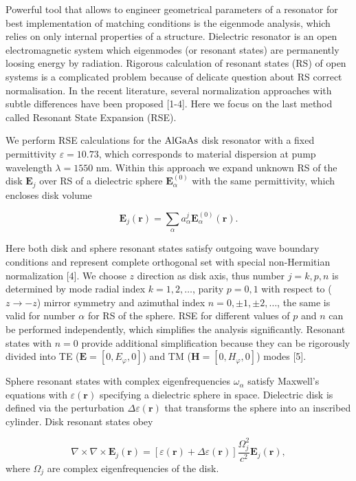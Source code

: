 \documentclass[prl,notitlepage,twocolumn]{revtex4}
\begin{document}
Powerful tool that allows to engineer geometrical parameters of a resonator for best 	implementation of matching conditions is the eigenmode analysis, which relies on only internal properties of a structure. Dielectric resonator is an open electromagnetic system which eigenmodes (or resonant states)  are permanently loosing energy by radiation. Rigorous calculation of resonant states (RS) of open systems is a complicated problem because of delicate question about RS correct normalisation. In the recent literature, several normalization approaches with subtle differences have been proposed [1-4]. Here we focus on the last method called Resonant State Expansion (RSE).

We perform RSE calculations for the ${\rm AlGaAs}$ disk resonator with a fixed permittivity $\varepsilon = 10.73$, which corresponds to material dispersion at pump wavelength $\lambda =1550$ nm. Within this approach we expand unknown RS of the disk $\mathbf{E}_{j}$ over RS of a dielectric sphere $\mathbf{E}^{(0)}_{\alpha}$ with the same permittivity, which encloses disk volume

\begin{equation}
\mathbf{E}_{j}(\mathbf{r}) = \sum_{\alpha} a_{\alpha}^j \mathbf{E}^{(0)}_{\alpha}(\mathbf{r}).
\label{eq:RS1}
\end{equation}

Here both disk and sphere resonant states satisfy outgoing wave boundary conditions and represent complete orthogonal set with special non-Hermitian normalization [4]. We choose $z$ direction as disk axis, thus number $j=k,p,n$ is determined by mode radial index $k=1,2,\dots$, parity  $p=0,1$ with respect to ($z\rightarrow -z$) mirror symmetry and azimuthal index $n=0,\pm1,\pm2,\dots$, the same is valid for number $\alpha$ for RS of the sphere. RSE for different values of $p$ and $n$ can be performed independently, which simplifies the analysis significantly. Resonant states with $n=0$ provide additional simplification because they can be rigorously divided into TE ($\mathbf{E} = [0, E_\varphi, 0]$) and TM ($\mathbf{H} = [0, H_\varphi, 0]$) modes [5].

Sphere resonant states with complex eigenfrequencies $\omega_\alpha$ satisfy Maxwell's equations with $\varepsilon(\mathbf{r})$ specifying a dielectric sphere in space. Dielectric disk is defined via the perturbation $\Delta\varepsilon(\mathbf{r})$ that transforms the sphere into an inscribed cylinder. Disk resonant states obey 

\begin{equation}
\nabla \times \nabla \times \mathbf{E}_{j}(\mathbf{r}) = [\varepsilon(\mathbf{r})+\Delta\varepsilon(\mathbf{r})]\frac{\Omega_j^2}{c^2} \mathbf{E}_{j}(\mathbf{r}),
\label{eq:RS2}
\end{equation}
where $\Omega_j$ are complex eigenfrequencies of the disk. 
\end{document}
